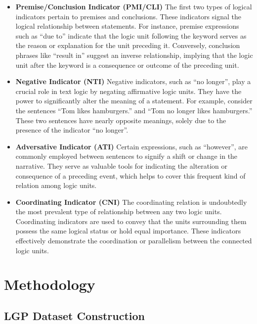 \documentclass[11pt]{article}
\begin{document}
\begin{itemize}
    \item \textbf{Premise/Conclusion Indicator (PMI/CLI)} The first two types of logical indicators pertain to premises and conclusions. These indicators signal the logical relationship between statements. For instance, premise expressions such as ``due to'' indicate that the logic unit following the keyword serves as the reason or explanation for the unit preceding it. Conversely, conclusion phrases like ``result in'' suggest an inverse relationship, implying that the logic unit after the keyword is a consequence or outcome of the preceding unit.
    \item \textbf{Negative Indicator (NTI)} Negative indicators, such as ``no longer'', play a crucial role in text logic by negating affirmative logic units. They have the power to significantly alter the meaning of a statement. For example, consider the sentences ``Tom likes hamburgers.'' and ``Tom no longer likes hamburgers.'' These two sentences have nearly opposite meanings, solely due to the presence of the indicator ``no longer''.
    \item \textbf{Adversative Indicator (ATI)} Certain expressions, such as ``however'', are commonly employed between sentences to signify a shift or change in the narrative. They serve as valuable tools for indicating the alteration or consequence of a preceding event, which helps to cover this frequent kind of relation among logic units.
    \item \textbf{Coordinating Indicator (CNI)} The coordinating relation is undoubtedly the most prevalent type of relationship between any two logic units. Coordinating indicators are used to convey that the units surrounding them possess the same logical status or hold equal importance. These indicators effectively demonstrate the coordination or parallelism between the connected logic units.


\end{itemize}












\section{Methodology} \label{method}


\subsection{LGP Dataset Construction} \label{lgpdatasetconstruction}
\end{document}
